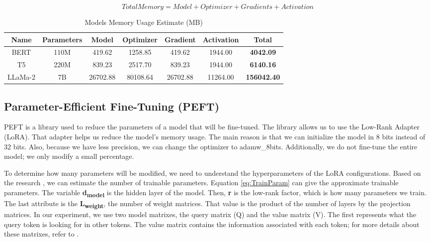 \[ Total Memory = Model + Optimizer + Gradients + Activation \label{eq:total} \tag{5} \] 

\begin{table}[H]
	\centering
	\caption{Models Memory Usage Estimate (MB)}
	\begin{tabular}{||c | c | c | c | c | c | c||} 
		\hline
		\textbf{Name} & \textbf{Parameters} & \textbf{Model} & \textbf{Optimizer} & \textbf{Gradient} & \textbf{Activation} & \textbf{Total} \\ [1ex] 
		\hline
		BERT & 110M & 419.62 & 1258.85 & 419.62 & 1944.00 & \textbf{4042.09} \\ [1ex]
		\hline
		T5 & 220M & 839.23 & 2517.70 & 839.23 & 1944.00 & \textbf{6140.16}  \\[1ex]
		\hline
		LLaMa-2 & 7B & 26702.88 & 80108.64 & 26702.88 & 11264.00 & \textbf{156042.40}  \\[1ex]
		\hline
	\end{tabular}
	\label{table:MemoryUsage}
\end{table}

\subsection{Parameter-Efficient Fine-Tuning (PEFT)}
PEFT is a library used to reduce the parameters of a model that will be fine-tuned. The library allows us to use the Low-Rank Adapter (LoRA). That adapter helps us reduce the model's memory usage. The main reason is that we can initialize the model in 8 bits instead of 32 bits. Also, because we have less precision, we can change the optimizer to adamw\_8bits. Additionally, we do not fine-tune the entire model; we only modify a small percentage.

To determine how many parameters will be modified, we need to understand the hyperparameters of the LoRA configurations. Based on the research \cite{hu2021loralowrankadaptationlarge}, we can estimate the number of trainable parameters. Equation \ref{eq:TrainParam} can give the approximate trainable parameters. The variable \textbf{d\textsubscript{model}} is the hidden layer of the model. Then, \textbf{r} is the low-rank factor, which is how many parameters we train. The last attribute is the \textbf{L\textsubscript{weight}}, the number of weight matrices. That value is the product of the number of layers by the projection matrices. In our experiment, we use two model matrixes, the query matrix (Q) and the value matrix (V). The first represents what the query token is looking for in other tokens. The value matrix contains the information associated with each token; for more details about these matrixes, refer to \cite{vaswani2023attentionneed}.

